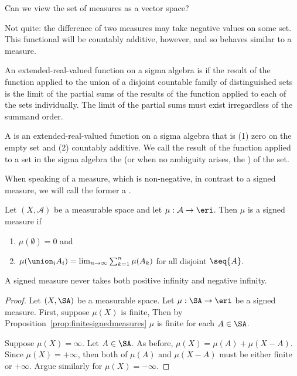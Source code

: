 
\sbasic



\sstart



Can we view the set of
measures as a vector space?

Not quite:
the difference of two measures
may take negative values
on some set.
This functional
will be countably
additive, however, and
so behaves similar to a measure.


An extended-real-valued
function on a
sigma algebra is
if the result of the function applied to
the union of a disjoint countable family of
distinguished sets is the limit of the partial
sums of the results of the function applied
to each of the sets individually.
The limit of the partial sums must
exist irregardless of the summand order.

A
is an extended-real-valued
function on a
sigma algebra that is
(1) zero on the empty set and
(2) countably additive.
We call the result of the function
applied to a set in the sigma
algebra the
(or when no ambiguity arises, the
)
of the set.

When speaking of a measure,
which is non-negative,
in contrast to a signed measure,
we will call the former a
.


Let
$(X, \mathcal{A})$
be a measurable space
and let
$\mu: \mathcal{A} \to \eri$.
Then $\mu$ is a signed measure if
\begin{enumerate}
  \item $\mu(\emptyset) = 0$ and
  \item
  $\mu(\union_{i} A_i) =
    \lim_{n \to \infty}
      \sum_{k = 1}^{n} \mu(A_k)$
  for all disjoint $\seq{A}$.
\end{enumerate}

\begin{prop}
A signed measure never takes
both positive infinity and
negative infinity.
\begin{proof}
Let $(X,\SA)$ be a measurable space.
Let $\mu: \SA \to \eri$ be a signed measure.
First, suppose $\mu(X)$ is finite,
Then by
Proposition~\ref{prop:finitesignedmeasures}
$\mu$ is finite for each $A \in \SA$.

Suppose $\mu(X) = \infty$.
Let $A \in \SA$.
As before,
$\mu(X) = \mu(A) + \mu(X - A)$.
Since $\mu(X) = +\infty$, then
both of $\mu(A)$ and $\mu(X-A)$
must be either finite or $+\infty$.
Argue similarly for $\mu(X) = -\infty$.
\end{proof}
\end{prop}

\strats

